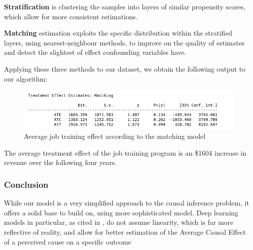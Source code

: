 \documentclass{article}
\begin{document}
\textbf{Stratification} is clustering the samples into layers of similar propensity scores, which allow for more consistent estimations.

\textbf{Matching} estimation exploits the specific distribution within the stratified layers, using nearest-neighbour methods, to improve on the quality of estimates and detect the slightest of effect confounding variables have.

Applying these three methods to our dataset, we obtain the following output to our algorithm: 

\begin{figure}[h]
\small
\centering
\includegraphics[width=0.8 \textwidth]{../figures/matching_estimate.png}
\caption{Average job training effect according to the matching model}
\end{figure}




The average treatment effect of the job training program is an \$1604 increase in revenue over the following four years. 

\subsubsection{Conclusion}

While our model is a very simplified approach to the causal inference problem, it offers a solid base to build on, using more sophisticated model. 
Deep learning models in particular, as cited in \cite{yao2020survey}, do not assume linearity, which is far more reflective of reality, and allow for better estimation of the Average Causal Effect of a perceived cause on a specific outcome








\newpage
{}
\nocite{*}    %

\end{document}
